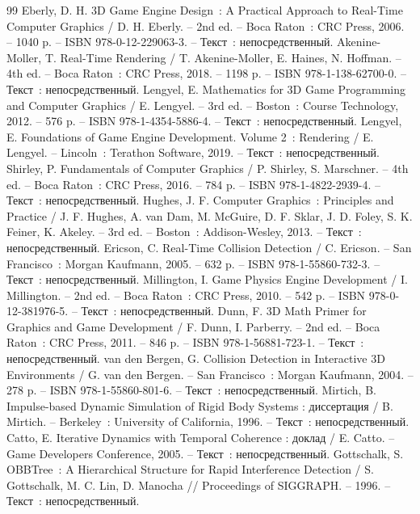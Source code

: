 \begin{thebibliography}{99}
	 Eberly, D. H. 3D Game Engine Design~: A Practical Approach to Real-Time Computer Graphics / D. H. Eberly. -- 2nd ed. -- Boca Raton~: CRC Press, 2006. -- 1040 p. -- ISBN 978-0-12-229063-3. -- Текст~: непосредственный.
	 Akenine-Moller, T. Real-Time Rendering / T. Akenine-Moller, E. Haines, N. Hoffman. -- 4th ed. -- Boca Raton~: CRC Press, 2018. -- 1198 p. -- ISBN 978-1-138-62700-0. -- Текст~: непосредственный.
	 Lengyel, E. Mathematics for 3D Game Programming and Computer Graphics / E. Lengyel. -- 3rd ed. -- Boston~: Course Technology, 2012. -- 576 p. -- ISBN 978-1-4354-5886-4. -- Текст~: непосредственный.
	 Lengyel, E. Foundations of Game Engine Development. Volume 2~: Rendering / E. Lengyel. -- Lincoln~: Terathon Software, 2019. -- Текст~: непосредственный.
	 Shirley, P. Fundamentals of Computer Graphics / P. Shirley, S. Marschner. -- 4th ed. -- Boca Raton~: CRC Press, 2016. -- 784 p. -- ISBN 978-1-4822-2939-4. -- Текст~: непосредственный.
	 Hughes, J. F. Computer Graphics~: Principles and Practice / J. F. Hughes, A. van Dam, M. McGuire, D. F. Sklar, J. D. Foley, S. K. Feiner, K. Akeley. -- 3rd ed. -- Boston~: Addison-Wesley, 2013. -- Текст~: непосредственный.
	 Ericson, C. Real-Time Collision Detection / C. Ericson. -- San Francisco~: Morgan Kaufmann, 2005. -- 632 p. -- ISBN 978-1-55860-732-3. -- Текст~: непосредственный.
	 Millington, I. Game Physics Engine Development / I. Millington. -- 2nd ed. -- Boca Raton~: CRC Press, 2010. -- 542 p. -- ISBN 978-0-12-381976-5. -- Текст~: непосредственный.
	 Dunn, F. 3D Math Primer for Graphics and Game Development / F. Dunn, I. Parberry. -- 2nd ed. -- Boca Raton~: CRC Press, 2011. -- 846 p. -- ISBN 978-1-56881-723-1. -- Текст~: непосредственный.
	 van den Bergen, G. Collision Detection in Interactive 3D Environments / G. van den Bergen. -- San Francisco~: Morgan Kaufmann, 2004. -- 278 p. -- ISBN 978-1-55860-801-6. -- Текст~: непосредственный.
	 Mirtich, B. Impulse-based Dynamic Simulation of Rigid Body Systems : диссертация / B. Mirtich. -- Berkeley~: University of California, 1996. -- Текст~: непосредственный.
	 Catto, E. Iterative Dynamics with Temporal Coherence : доклад / E. Catto. -- Game Developers Conference, 2005. -- Текст~: непосредственный.
	 Gottschalk, S. OBBTree~: A Hierarchical Structure for Rapid Interference Detection / S. Gottschalk, M. C. Lin, D. Manocha // Proceedings of SIGGRAPH. -- 1996. -- Текст~: непосредственный.

\end{thebibliography}
